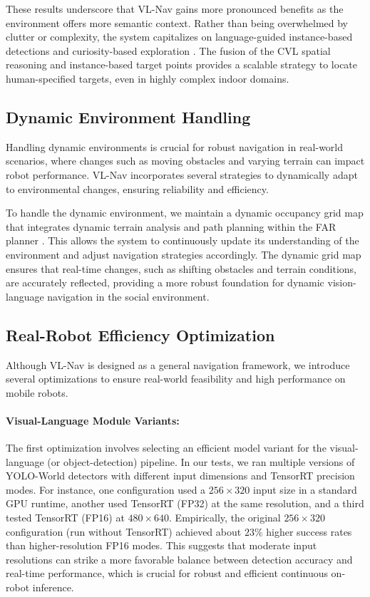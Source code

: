 These results underscore that VL-Nav gains more pronounced benefits as the environment offers more semantic context. Rather than being overwhelmed by clutter or complexity, the system capitalizes on language-guided instance-based detections and curiosity-based exploration . The fusion of the CVL spatial reasoning and instance-based target points provides a scalable strategy to locate human-specified targets, even in highly complex indoor domains.


\subsection{Dynamic Environment Handling}

Handling dynamic environments is crucial for robust navigation in real-world scenarios, where changes such as moving obstacles  and varying terrain can impact robot performance. VL-Nav incorporates several strategies to dynamically adapt to environmental changes, ensuring reliability and efficiency.

To handle the dynamic environment, we maintain a dynamic occupancy grid map that integrates dynamic terrain analysis and path planning within the FAR planner \cite{yang2022far}. This allows the system to continuously update its understanding of the environment and adjust navigation strategies accordingly. The dynamic grid map ensures that real-time changes, such as shifting obstacles and terrain conditions, are accurately reflected, providing a more robust foundation for dynamic vision-language navigation in the social environment.

\subsection{Real-Robot Efficiency Optimization}

Although VL-Nav is designed as a general navigation framework, we introduce several optimizations to ensure real-world feasibility and high performance on mobile robots.



\paragraph{Visual-Language Module Variants:}
The first optimization involves selecting an efficient model variant for the visual-language (or object-detection) pipeline. In our tests, we ran multiple versions of YOLO-World \cite{cheng2024yolo} detectors with different input dimensions and TensorRT precision modes. For instance, one configuration used a $256 \times 320$ input size in a standard GPU runtime, another used TensorRT (FP32) at the same resolution, and a third tested TensorRT (FP16) at $480 \times 640$. Empirically, the original $256 \times 320$ configuration (run without TensorRT) achieved about $23\%$ higher success rates than higher-resolution FP16 modes. This suggests that moderate input resolutions can strike a more favorable balance between detection accuracy and real-time performance, which is crucial for robust and efficient continuous on-robot inference.

